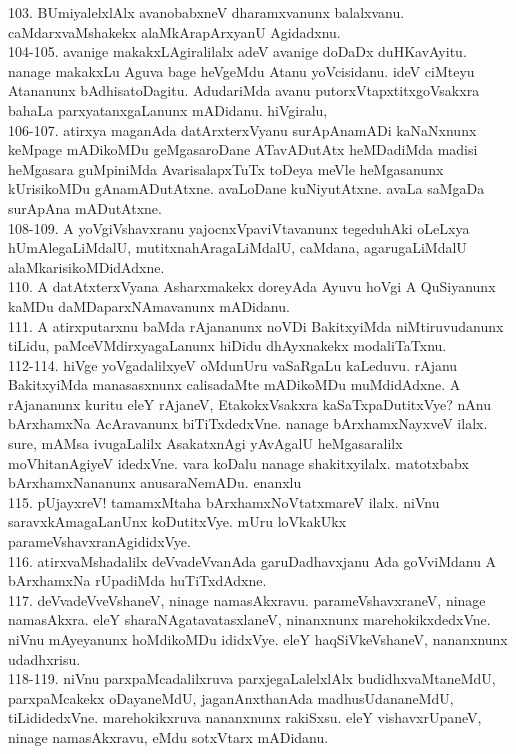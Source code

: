 \documentclass{article}
\begin{document}
103. BUmiyalelxlAlx avanobabxneV dharamxvanunx balalxvanu. caMdarxvaMshakekx alaMkArapArxyanU Agidadxnu.\\
104-105. avanige makakxLAgiralilalx adeV avanige doDaDx duHKavAyitu. nanage makakxLu Aguva bage heVgeMdu Atanu yoVcisidanu. ideV ciMteyu Atananunx bAdhisatoDagitu. AdudariMda avanu putorxVtapxtitxgoVsakxra bahaLa parxyatanxgaLanunx mADidanu. hiVgiralu,\\
106-107. atirxya maganAda datArxterxVyanu surApAnamADi kaNaNxnunx keMpage mADikoMDu geMgasaroDane ATavADutAtx heMDadiMda madisi heMgasara guMpiniMda AvarisalapxTuTx toDeya meVle heMgasanunx kUrisikoMDu gAnamADutAtxne. avaLoDane kuNiyutAtxne. avaLa saMgaDa surApAna mADutAtxne.\\
108-109. A yoVgiVshavxranu yajocnxVpaviVtavanunx tegeduhAki oLeLxya hUmAlegaLiMdalU, mutitxnahAragaLiMdalU, caMdana, agarugaLiMdalU alaMkarisikoMDidAdxne.\\
110. A datAtxterxVyana Asharxmakekx doreyAda Ayuvu hoVgi A QuSiyanunx kaMDu daMDaparxNAmavanunx mADidanu.\\
111. A atirxputarxnu baMda rAjananunx noVDi BakitxyiMda niMtiruvudanunx tiLidu, paMceVMdirxyagaLanunx hiDidu dhAyxnakekx modaliTaTxnu.\\
112-114. hiVge yoVgadalilxyeV oMdunUru vaSaRgaLu kaLeduvu. rAjanu BakitxyiMda manasasxnunx calisadaMte mADikoMDu muMdidAdxne. A rAjananunx kuritu eleY rAjaneV, EtakokxVsakxra kaSaTxpaDutitxVye? nAnu bArxhamxNa AcAravanunx biTiTxdedxVne. nanage bArxhamxNayxveV ilalx. sure, mAMsa ivugaLalilx AsakatxnAgi yAvAgalU heMgasaralilx moVhitanAgiyeV idedxVne. vara koDalu nanage shakitxyilalx. matotxbabx bArxhamxNananunx anusaraNemADu. enanxlu\\
115. pUjayxreV! tamamxMtaha bArxhamxNoVtatxmareV ilalx. niVnu saravxkAmagaLanUnx koDutitxVye. mUru loVkakUkx parameVshavxranAgididxVye.\\
116. atirxvaMshadalilx deVvadeVvanAda garuDadhavxjanu Ada goVviMdanu A bArxhamxNa rUpadiMda huTiTxdAdxne.\\
117. deVvadeVveVshaneV, ninage namasAkxravu. parameVshavxraneV, ninage namasAkxra. eleY sharaNAgatavatasxlaneV, ninanxnunx marehokikxdedxVne. niVnu mAyeyanunx hoMdikoMDu ididxVye. eleY haqSiVkeVshaneV, nananxnunx udadhxrisu.\\
118-119. niVnu parxpaMcadalilxruva parxjegaLalelxlAlx budidhxvaMtaneMdU, parxpaMcakekx oDayaneMdU, jaganAnxthanAda madhusUdananeMdU, tiLididedxVne. marehokikxruva nananxnunx rakiSxsu. eleY vishavxrUpaneV, ninage namasAkxravu, eMdu sotxVtarx mADidanu.\\
\end{document}
